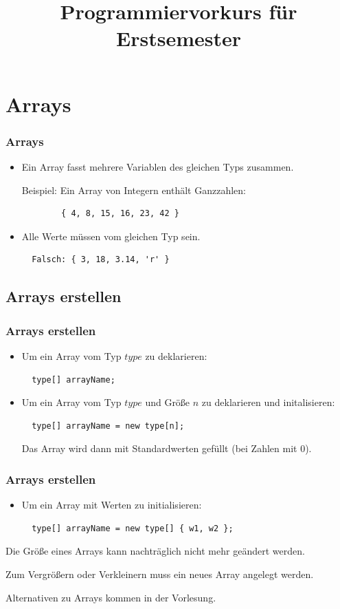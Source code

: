 \documentclass[final]{beamer}
\title{Programmiervorkurs für Erstsemester}
\begin{document}
\lstset{tabsize=4}
\lstset{basicstyle=\small}
\lstset{language=java}

\begin{frame}
  \titlepage
\end{frame}

\section{Arrays}
\begin{frame}[containsverbatim]
  \frametitle{Arrays}
  \begin{itemize}
	\item{Ein Array fasst mehrere Variablen des gleichen Typs zusammen.

	Beispiel: Ein Array von Integern enthält Ganzzahlen:}
	  \begin{lstlisting}
		{ 4, 8, 15, 16, 23, 42 } 
	  \end{lstlisting}
	\item{Alle Werte müssen vom gleichen Typ sein.}
	  \begin{lstlisting}
  Falsch: { 3, 18, 3.14, 'r' }
	  \end{lstlisting}
  \end{itemize}
\end{frame}

\subsection{Arrays erstellen}
\begin{frame}[containsverbatim]
  \frametitle{Arrays erstellen}
  \begin{itemize}
	\item{Um ein Array vom Typ $type$ zu deklarieren:
	  \begin{lstlisting}
  type[] arrayName;
	  \end{lstlisting}
	  }
	\item{Um ein Array vom Typ $type$ und Größe $n$ zu deklarieren und initalisieren:
	  \begin{lstlisting}
  type[] arrayName = new type[n];
	  \end{lstlisting}
	  Das Array wird dann mit Standardwerten gefüllt (bei Zahlen mit $0$).
	  }
  \end{itemize}
\end{frame}
\begin{frame}[containsverbatim]
  \frametitle{Arrays erstellen}
  \begin{itemize}
	\item{Um ein Array mit Werten zu initialisieren:
	  \begin{lstlisting}
  type[] arrayName = new type[] { w1, w2 };
	  \end{lstlisting}
	  }
  \end{itemize}
  Die Größe eines Arrays kann nachträglich nicht mehr geändert werden.

  Zum Vergrößern oder Verkleinern muss ein neues Array angelegt werden.

  Alternativen zu Arrays kommen in der Vorlesung.
\end{frame}
\end{document}
